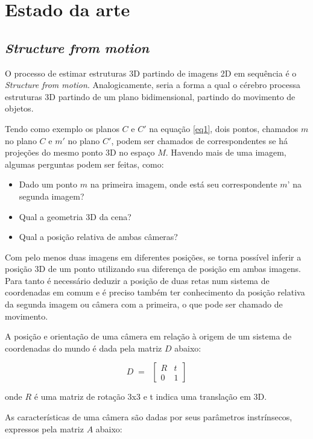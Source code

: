 
\chapter{Estado da arte}

\section{\textit{Structure from motion}}

O processo de estimar estruturas 3D partindo de imagens 2D em sequência é o \textit{Structure from motion}. Analogicamente, seria a forma a qual o cérebro processa estruturas 3D partindo de um plano bidimensional, partindo do movimento de objetos.

Tendo como exemplo os planos $C$ e $C'$ na equação \eqref{eq1}, dois pontos, chamados $m$ no plano $C$ e $m'$ no plano $C'$, podem ser chamados de correspondentes se há projeções do mesmo ponto 3D no espaço $M$. Havendo mais de uma imagem, algumas perguntas podem ser feitas, como:

\begin{itemize}
	\item{Dado um ponto $m$ na primeira imagem, onde está seu correspondente $m’$ na segunda imagem?}
	\item{Qual a geometria 3D da cena?}
	\item{Qual a posição relativa de ambas câmeras?}
\end{itemize}
	
Com pelo menos duas imagens em diferentes posições, se torna possível inferir a posição 3D de um ponto utilizando sua diferença de posição em ambas imagens. Para tanto é necessário deduzir a posição de duas retas num sistema de coordenadas em comum e é preciso também ter conhecimento da posição relativa da segunda imagem ou câmera com a primeira, o que pode ser chamado de movimento.

A posição e orientação de uma câmera em relação à origem de um sistema de coordenadas do mundo é dada pela matriz $D$ abaixo:

\begin{equation}
D \; = \; \; 
\begin{bmatrix}
R & t \\
0 & 1
\end{bmatrix}
\end{equation}

\noindent
onde $R$ é uma matriz de rotação 3x3 e t indica uma translação em 3D.

As características de uma câmera são dadas por seus parâmetros instrínsecos, expressos pela matriz $A$ abaixo:


